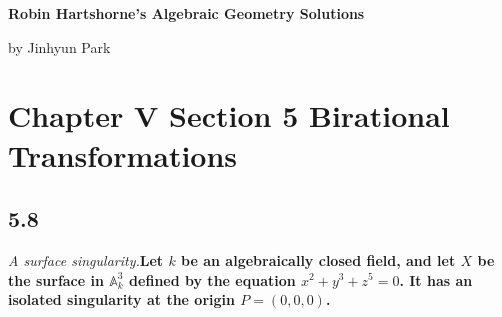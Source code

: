 \documentclass[11pt]{amsart}          %
\newcommand{\bbA}{\mathbb{A}}
\begin{document}
\begin{center}
\bf
\large Robin Hartshorne's Algebraic Geometry Solutions
\end{center}
\begin{center}
by Jinhyun Park
\end{center}
\vskip0.5cm

\section*{Chapter V Section 5 Birational Transformations}

\subsection*{5.8} \emph{A surface singularity.}\textbf{Let $k$ be an algebraically closed field, and let $X$ be the surface in $\bbA_k ^3$ defined by the equation $x^2 +y^3 + z^5 = 0$. It has an isolated singularity at the origin $P = (0,0,0)$.}
\end{document}
